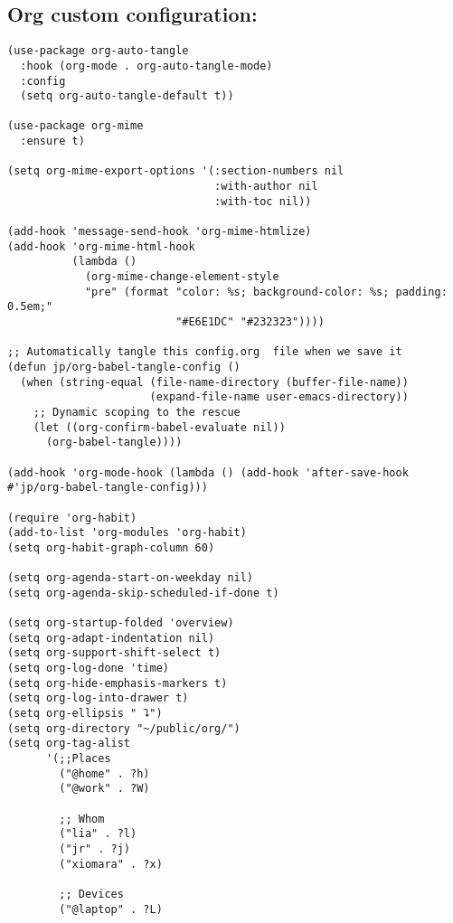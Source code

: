 \documentclass[11pt]{article}
\begin{document}
\subsection{Org custom configuration:}
\label{sec:orgfd7eb46}
\begin{verbatim}
(use-package org-auto-tangle
  :hook (org-mode . org-auto-tangle-mode)
  :config
  (setq org-auto-tangle-default t))

(use-package org-mime
  :ensure t)

(setq org-mime-export-options '(:section-numbers nil
                                :with-author nil
                                :with-toc nil))

(add-hook 'message-send-hook 'org-mime-htmlize)
(add-hook 'org-mime-html-hook
          (lambda ()
            (org-mime-change-element-style
            "pre" (format "color: %s; background-color: %s; padding: 0.5em;"
                          "#E6E1DC" "#232323"))))

;; Automatically tangle this config.org  file when we save it
(defun jp/org-babel-tangle-config ()
  (when (string-equal (file-name-directory (buffer-file-name))
                      (expand-file-name user-emacs-directory))
    ;; Dynamic scoping to the rescue
    (let ((org-confirm-babel-evaluate nil))
      (org-babel-tangle))))

(add-hook 'org-mode-hook (lambda () (add-hook 'after-save-hook #'jp/org-babel-tangle-config)))

(require 'org-habit)
(add-to-list 'org-modules 'org-habit)
(setq org-habit-graph-column 60)

(setq org-agenda-start-on-weekday nil)
(setq org-agenda-skip-scheduled-if-done t)

(setq org-startup-folded 'overview)
(setq org-adapt-indentation nil)
(setq org-support-shift-select t)
(setq org-log-done 'time)
(setq org-hide-emphasis-markers t)
(setq org-log-into-drawer t)
(setq org-ellipsis " ⮧")
(setq org-directory "~/public/org/")
(setq org-tag-alist
      '(;;Places
        ("@home" . ?h)
        ("@work" . ?W)

        ;; Whom
        ("lia" . ?l)
        ("jr" . ?j)
        ("xiomara" . ?x)

        ;; Devices
        ("@laptop" . ?L)


\end{verbatim}
\end{document}
